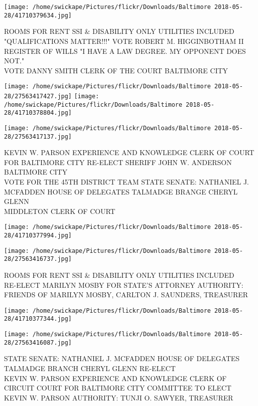 \documentclass[10pt,letterpaper]{article}
\begin{document}
\vspace{0.25in}
\texttt{[image: /home/swickape/Pictures/flickr/Downloads/Baltimore 2018-05-28/41710379634.jpg]}

ROOMS FOR RENT SSI \& DISABILITY ONLY UTILITIES INCLUDED\\
"QUALIFICATIONS MATTER!!!" VOTE ROBERT M. HIGGINBOTHAM II REGISTER OF WILLS "I HAVE A LAW DEGREE.  MY OPPONENT DOES NOT."\\
VOTE DANNY SMITH CLERK OF THE COURT BALTIMORE CITY\\
\pagebreak

\texttt{[image: /home/swickape/Pictures/flickr/Downloads/Baltimore 2018-05-28/27563417427.jpg]}
\texttt{[image: /home/swickape/Pictures/flickr/Downloads/Baltimore 2018-05-28/41710378804.jpg]}

\vspace{0.25in}
\texttt{[image: /home/swickape/Pictures/flickr/Downloads/Baltimore 2018-05-28/27563417137.jpg]}

KEVIN W. PARSON EXPERIENCE AND KNOWLEDGE CLERK OF COURT FOR BALTIMORE CITY RE{-}ELECT SHERIFF JOHN W. ANDERSON BALTIMORE CITY\\
VOTE FOR THE 45TH DISTRICT TEAM STATE SENATE: NATHANIEL J. MCFADDEN HOUSE OF DELEGATES TALMADGE BRANGE CHERYL GLENN\\
MIDDLETON CLERK OF COURT\\
\pagebreak

\texttt{[image: /home/swickape/Pictures/flickr/Downloads/Baltimore 2018-05-28/41710377994.jpg]}

\vspace{0.25in}
\texttt{[image: /home/swickape/Pictures/flickr/Downloads/Baltimore 2018-05-28/27563416737.jpg]}

ROOMS FOR RENT SSI \& DISABILITY ONLY UTILITIES INCLUDED\\
RE{-}ELECT MARILYN MOSBY FOR STATE'S ATTORNEY AUTHORITY: FRIENDS OF MARILYN MOSBY, CARLTON J. SAUNDERS, TREASURER\\
\pagebreak

\texttt{[image: /home/swickape/Pictures/flickr/Downloads/Baltimore 2018-05-28/41710377344.jpg]}

\vspace{0.25in}
\texttt{[image: /home/swickape/Pictures/flickr/Downloads/Baltimore 2018-05-28/27563416087.jpg]}

STATE SENATE: NATHANIEL J. MCFADDEN HOUSE OF DELEGATES TALMADGE BRANCH CHERYL GLENN RE{-}ELECT\\
KEVIN W. PARSON EXPERIENCE AND KNOWLEDGE CLERK OF CIRCUIT COURT FOR BALTIMORE CITY COMMITTEE TO ELECT KEVIN W. PARSON AUTHORITY: TUNJI O. SAWYER, TREASURER\\
\pagebreak
\end{document}
